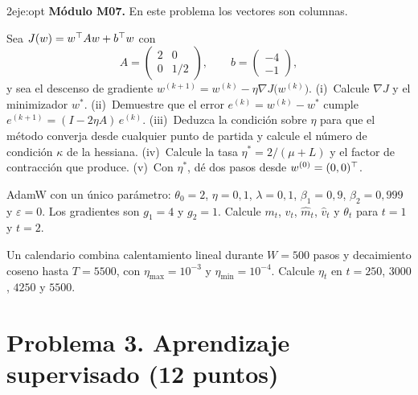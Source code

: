\begin{ejercicio}{2}{eje:opt}
\textbf{Módulo M07.} En este problema los vectores son columnas.
\begin{apartados}
  \item {} Sea $J(w)=w^{\top} Aw+b^{\top} w$ con
  \[
  A=\begin{pmatrix}2&0\\0&1/2\end{pmatrix},\qquad b=\begin{pmatrix}-4\\-1\end{pmatrix},
  \]
  y sea el descenso de gradiente $w^{(k+1)}=w^{(k)}-\eta\nabla J\bigl(w^{(k)}\bigr)$.
  (i)~Calcule $\nabla J$ y el minimizador $w^{*}$.
  (ii)~Demuestre que el error $e^{(k)}=w^{(k)}-w^{*}$ cumple $e^{(k+1)}=(I-2\eta A)\,e^{(k)}$.
  (iii)~Deduzca la condición sobre $\eta$ para que el método converja desde cualquier punto de partida y calcule el número de condición $\kappa$ de la hessiana.
  (iv)~Calcule la tasa $\eta^{*}=2/(\mu+L)$ y el factor de contracción que produce.
  (v)~Con $\eta^{*}$, dé dos pasos desde $w^{(0)}=(0,0)^{\top}$.
  \item {} AdamW con un único parámetro: $\theta_0=2$, $\eta=0{,}1$, $\lambda=0{,}1$, $\beta_1=0{,}9$, $\beta_2=0{,}999$ y $\varepsilon=0$. Los gradientes son $g_1=4$ y $g_2=1$. Calcule $m_t$, $v_t$, $\hat m_t$, $\hat v_t$ y $\theta_t$ para $t=1$ y $t=2$.
  \item {} Un calendario combina calentamiento lineal durante $W=500$ pasos y decaimiento coseno hasta $T=5500$, con $\eta_{\max}=10^{-3}$ y $\eta_{\min}=10^{-4}$. Calcule $\eta_t$ en $t=250$, $3000$, $4250$ y $5500$.
\end{apartados}
\end{ejercicio}

\section*{Problema 3. Aprendizaje supervisado (12 puntos)}

